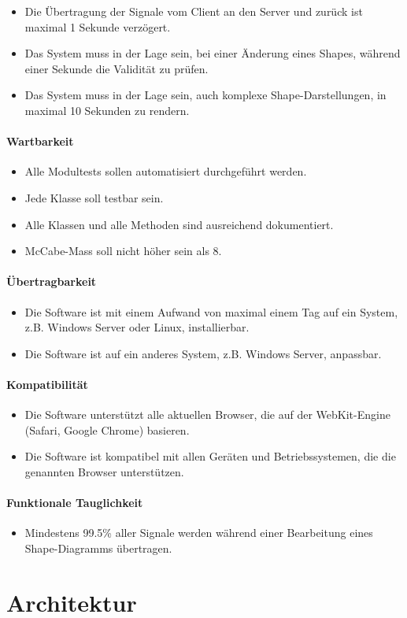 \begin{itemize}
  \item Die Übertragung der Signale vom Client an den Server und zurück ist maximal 1 Sekunde verzögert.
  \item Das System muss in der Lage sein, bei einer Änderung eines Shapes, während einer Sekunde die Validität zu prüfen.
  \item Das System muss in der Lage sein, auch komplexe Shape-Darstellungen, in maximal 10 Sekunden zu rendern.
\end{itemize}

\paragraph{Wartbarkeit}

\begin{itemize}
  \item Alle Modultests sollen automatisiert durchgeführt werden.
  \item Jede Klasse soll testbar sein.
  \item Alle Klassen und alle Methoden sind ausreichend dokumentiert.
  \item McCabe-Mass soll nicht höher sein als 8.
\end{itemize}

\paragraph{Übertragbarkeit}

\begin{itemize}
  \item Die Software ist mit einem Aufwand von maximal einem Tag auf ein System, z.B. Windows Server oder Linux, installierbar.
  \item Die Software ist auf ein anderes System, z.B. Windows Server, anpassbar.
\end{itemize}

\paragraph{Kompatibilität}

\begin{itemize}
  \item Die Software unterstützt alle aktuellen Browser, die auf der WebKit-Engine (Safari, Google Chrome) basieren.
  \item Die Software ist kompatibel mit allen Geräten und Betriebssystemen, die die genannten Browser unterstützen.
\end{itemize}

\paragraph{Funktionale Tauglichkeit}

\begin{itemize}
  \item Mindestens 99.5\% aller Signale werden während einer Bearbeitung eines Shape-Diagramms übertragen.
\end{itemize}



\section{Architektur}
